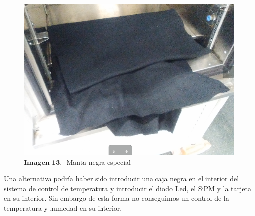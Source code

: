 \begin{itemize}
\begin{figure}[hbtp]
\centering
\includegraphics[scale=0.2]{MantaNegra.png}
\caption{\textbf{Imagen 13}.- Manta negra especial}
\end{figure}


Una alternativa podría haber sido introducir una caja negra en el interior del sistema de control de temperatura y introducir el diodo Led, el SiPM y la tarjeta en su interior. Sin embargo de esta forma no conseguimos un control de la temperatura y humedad en su interior.

\end{itemize}



\newpage